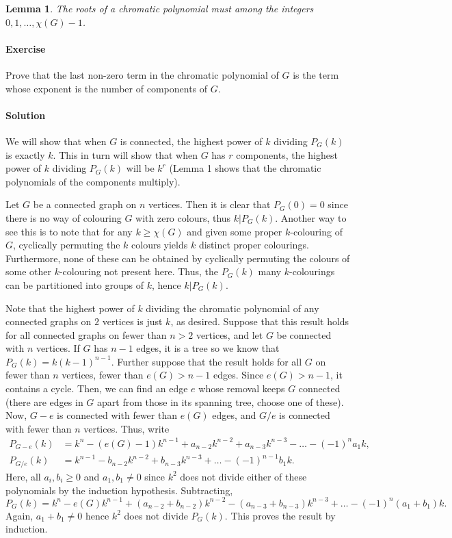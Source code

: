 \documentclass[10pt]{article}
\newcounter{prob}
\newcommand{\problem}{\stepcounter{prob}\paragraph{Exercise \arabic{prob}}}
\newcommand{\solution}{\paragraph{Solution}}
\newtheorem{lemma}{Lemma}
\begin{document}
    \begin{lemma}
        The roots of a chromatic polynomial must among the integers $0, 1, \dots,
        \chi(G) - 1$.
    \end{lemma}


        
    \problem Prove that the last non-zero term in the chromatic polynomial of $G$ is
    the term whose exponent is the number of components of $G$.

    \solution We will show that when $G$ is connected, the highest power of $k$
    dividing $P_G(k)$ is exactly $k$. This in turn will show that when $G$ has $r$
    components, the highest power of $k$ dividing $P_G(k)$ will be $k^r$ (Lemma 1
    shows that the chromatic polynomials of the components multiply).

    Let $G$ be a connected graph on $n$ vertices. Then it is clear that $P_G(0) = 0$
    since there is no way of colouring $G$ with zero colours, thus $k | P_G(k)$.
    Another way to see this is to note that for any $k \geq \chi(G)$ and given some
    proper $k$-colouring of $G$, cyclically permuting the $k$ colours yields $k$
    distinct proper colourings.  Furthermore, none of these can be obtained by
    cyclically permuting the colours of some other $k$-colouring not present here.
    Thus, the $P_G(k)$ many $k$-colourings can be partitioned into groups of $k$,
    hence $k | P_G(k)$.

    Note that the highest power of $k$ dividing the chromatic polynomial of any
    connected graphs on $2$ vertices is just $k$, as desired. Suppose that this
    result holds for all connected graphs on fewer than $n > 2$ vertices, and let $G$
    be connected with $n$ vertices. If $G$ has $n - 1$ edges, it is a tree so we know
    that $P_G(k) = k(k - 1)^{n - 1}$. Further suppose that the result holds for all
    $G$ on fewer than $n$ vertices, fewer than $e(G) > n - 1$ edges. Since $e(G) > n
    - 1$, it contains a cycle. Then, we can find an edge $e$ whose removal keeps $G$
    connected (there are edges in $G$ apart from those in its spanning tree, choose
    one of these). Now, $G - e$ is connected with fewer than $e(G)$ edges, and $G /
    e$ is connected with fewer than $n$ vertices. Thus, write
    \begin{align*}
        P_{G - e}(k) &= k^n - (e(G) - 1)k^{n - 1} + a_{n - 2}k^{n - 2} + a_{n - 3}k^{n
        - 3} - \dots - (-1)^na_1k, \\
        P_{G/e}(k) &= k^{n - 1} - b_{n - 2}k^{n - 2} + b_{n - 3}k^{n - 3} + \dots -
        (-1)^{n - 1}b_1k.
    \end{align*}
    Here, all $a_i, b_i \geq 0$ and $a_1, b_1 \neq 0$ since $k^2$ does not divide
    either of these polynomials by the induction hypothesis. Subtracting, \[
        P_G(k) = k^n - e(G)k^{n - 1} + (a_{n - 2} + b_{n - 2})k^{n - 2} - (a_{n - 3}
        + b_{n - 3})k^{n - 3} + \dots - (-1)^n(a_1 + b_1)k.
    \] Again, $a_1 + b_1 \neq 0$ hence $k^2$ does not divide $P_G(k)$. This proves the
    result by induction.
 
\end{document}

